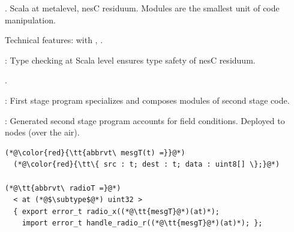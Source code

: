 
\begin{citemize}
\item {}. Scala at metalevel, nesC residuum. Modules are the
  smallest unit of code manipulation.
\item Technical features:  with ,
  .
\item {}: Type checking at Scala level ensures type safety of nesC
  residuum.
\item {}.
\end{citemize}
\stopslide


\centering
{}
\begin{citemize}
\item {}: First stage program specializes and composes modules of second stage
  code.
\item {}: Generated second stage program accounts for field conditions.
  Deployed to nodes (over the air).
\end{citemize}
\stopslide


\begin{lstlisting}[language=nesC]
(*@\color{red}{\tt{abbrvt\ mesgT(t) =}}@*)
  (*@\color{red}{\tt\{ src : t; dest : t; data : uint8[] \};}@*)

(*@\tt{abbrvt\ radioT =}@*)
  < at (*@$\subtype$@*) uint32 >
  { export error_t radio_x((*@\tt{mesgT}@*)(at)*); 
    import error_t handle_radio_r((*@\tt{mesgT}@*)(at)*); };
\end{lstlisting}

\begin{citemize}
\item {}
\item \color{black}{nesT modules parameterized by types and values.}
\end{citemize}
\stopslide

